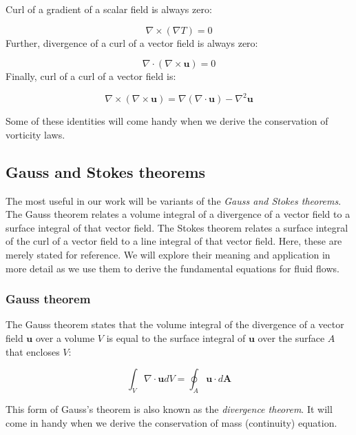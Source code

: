 \documentclass[12pt]{article}
\numberwithin{equation}{section}
\numberwithin{figure}{section}
\numberwithin{table}{section}
\begin{document}
Curl of a gradient of a scalar field is always zero:

\begin{equation}
  \nabla \times (\nabla T) = 0
\end{equation}
Further, divergence of a curl of a vector field is always zero:

\begin{equation}
  \nabla \cdot (\nabla \times \mathbf{u}) = 0
\end{equation}
Finally, curl of a curl of a vector field is:

\begin{equation}
  \nabla \times (\nabla \times \mathbf{u}) = \nabla (\nabla \cdot \mathbf{u}) - \nabla^2 \mathbf{u}
\end{equation}

Some of these identities will come handy when we derive the conservation of
vorticity laws.

\subsection{Gauss and Stokes theorems}

The most useful in our work will be variants of the
\textit{Gauss and Stokes theorems}.
The Gauss theorem relates a volume integral of a divergence of a vector field
to a surface integral of that vector field.
The Stokes theorem relates a surface integral of the curl of a vector field to
a line integral of that vector field.
Here, these are merely stated for reference.
We will explore their meaning and application in more detail as we use them
to derive the fundamental equations for fluid flows.

\subsubsection{Gauss theorem}

The Gauss theorem states that the volume integral of the
divergence of a vector field $\mathbf{u}$ over a volume $V$ is equal to the
surface integral of $\mathbf{u}$ over the surface $A$ that encloses $V$:

\begin{equation}
  \label{eq:divergence_theorem}
  \int_V \nabla \cdot \mathbf{u} dV = \oint_A \mathbf{u} \cdot d\mathbf{A}
\end{equation}

This form of Gauss's theorem is also known as the
\textit{divergence theorem}.
It will come in handy when we derive the conservation of mass (continuity)
equation.
\end{document}
